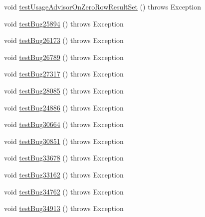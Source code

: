 \begin{DoxyCompactItemize}
\item 
void \mbox{\hyperlink{classtestsuite_1_1regression_1_1_result_set_regression_test_a9a179a9951b69e2e8b0d914aef3ac482}{test\+Usage\+Advisor\+On\+Zero\+Row\+Result\+Set}} ()  throws Exception 
\item 
void \mbox{\hyperlink{classtestsuite_1_1regression_1_1_result_set_regression_test_ae96bf431292ca3dc0ee61559038d7cf0}{test\+Bug25894}} ()  throws Exception 
\item 
void \mbox{\hyperlink{classtestsuite_1_1regression_1_1_result_set_regression_test_afa0bbccee8e4bffb0576ef3c0cd096f0}{test\+Bug26173}} ()  throws Exception 
\item 
void \mbox{\hyperlink{classtestsuite_1_1regression_1_1_result_set_regression_test_a025d8f10b5713673139e324fd77a7482}{test\+Bug26789}} ()  throws Exception 
\item 
void \mbox{\hyperlink{classtestsuite_1_1regression_1_1_result_set_regression_test_af045c2d205dada239fec239d477c2563}{test\+Bug27317}} ()  throws Exception 
\item 
void \mbox{\hyperlink{classtestsuite_1_1regression_1_1_result_set_regression_test_a85ca3f94b415a4fd27c69354a16eb5e5}{test\+Bug28085}} ()  throws Exception 
\item 
void \mbox{\hyperlink{classtestsuite_1_1regression_1_1_result_set_regression_test_a522f309cdbf6fcb9faa3607bece129a2}{test\+Bug24886}} ()  throws Exception 
\item 
void \mbox{\hyperlink{classtestsuite_1_1regression_1_1_result_set_regression_test_a4a7f176d9e3539b3acd902e97e904e17}{test\+Bug30664}} ()  throws Exception 
\item 
void \mbox{\hyperlink{classtestsuite_1_1regression_1_1_result_set_regression_test_a0e05299d6e5dcb1d9f65b8d2ea261ce4}{test\+Bug30851}} ()  throws Exception 
\item 
void \mbox{\hyperlink{classtestsuite_1_1regression_1_1_result_set_regression_test_a6f45076cd422b1dadc631967a3520dbd}{test\+Bug33678}} ()  throws Exception 
\item 
void \mbox{\hyperlink{classtestsuite_1_1regression_1_1_result_set_regression_test_ad4eafef7286440573ea5fe1f66709c7f}{test\+Bug33162}} ()  throws Exception 
\item 
void \mbox{\hyperlink{classtestsuite_1_1regression_1_1_result_set_regression_test_afeb30cf6f6d27697b0a8992194535217}{test\+Bug34762}} ()  throws Exception 
\item 
void \mbox{\hyperlink{classtestsuite_1_1regression_1_1_result_set_regression_test_ad141201442a5e2f03f7674ee44357a5e}{test\+Bug34913}} ()  throws Exception 

\end{DoxyCompactItemize}
